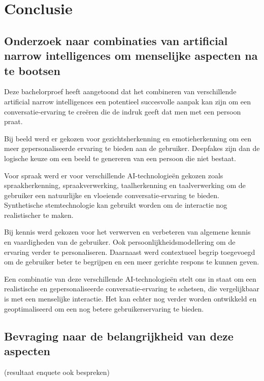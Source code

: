 
\chapter{Conclusie}
\label{ch:conclusie}


\section{Onderzoek naar combinaties van artificial narrow intelligences om menselijke aspecten na te bootsen}

Deze bachelorproef heeft aangetoond dat het combineren van verschillende artificial narrow intelligences een potentieel succesvolle aanpak kan zijn om een conversatie-ervaring te creëren die de indruk geeft dat men met een persoon praat.

Bij beeld werd er gekozen voor gezichtsherkenning en emotieherkenning om een meer gepersonaliseerde ervaring te bieden aan de gebruiker. Deepfakes zijn dan de logische keuze om een beeld te genereren van een persoon die niet bestaat.

Voor spraak werd er voor verschillende AI-technologieën gekozen zoals spraakherkenning, spraakverwerking, taalherkenning en taalverwerking om de gebruiker een natuurlijke en vloeiende conversatie-ervaring te bieden. Synthetische stemtechnologie kan gebruikt worden om de interactie nog realistischer te maken.

Bij kennis werd gekozen voor het verwerven en verbeteren van algemene kennis en vaardigheden van de gebruiker. Ook persoonlijkheidsmodellering om de ervaring verder te personaliseren. Daarnaast werd contextueel begrip toegevoegd om de gebruiker beter te begrijpen en een meer gerichte respons te kunnen geven.

Een combinatie van deze verschillende AI-technologieën stelt ons in staat om een realistische en gepersonaliseerde conversatie-ervaring te schetsen, die vergelijkbaar is met een menselijke interactie. Het kan echter nog verder worden ontwikkeld en geoptimaliseerd om een nog betere gebruikerservaring te bieden.

\section{Bevraging naar de belangrijkheid van deze aspecten}

(resultaat enquete ook bespreken)




